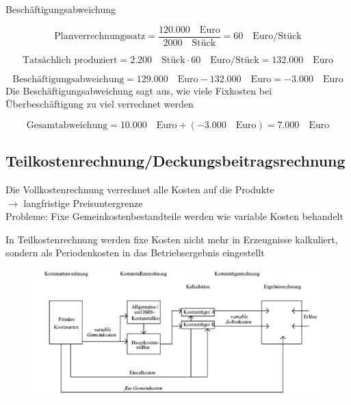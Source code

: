 \documentclass[a4paper,11pt, twoside]{article}
\begin{document}
Beschäftigungsabweichung

\[
\text{Planverrechnungssatz} = \frac{120.000\quad \text{Euro}}{2000\quad \text{Stück}} = 60\quad \text{Euro/Stück}
\]

\[
\text{Tatsächlich produziert} = 2.200\quad \text{Stück} \cdot 60\quad \text{Euro/Stück} = 132.000\quad \text{Euro}
\]

\[
\text{Beschäftigungsabweichung} = 129.000\quad \text{Euro} - 132.000\quad \text{Euro} = -3.000\quad \text{Euro}
\]
Die Beschäftigungsabweichung sagt aus, wie viele Fixkosten bei Überbeschäftigung zu viel verrechnet werden

\[
\text{Gesamtabweichung} = 10.000\quad \text{Euro} + (-3.000\quad \text{Euro}) = 7.000\quad \text{Euro}
\]

\subsection{Teilkostenrechnung/Deckungsbeitragsrechnung}

Die Vollkostenrechnung verrechnet alle Kosten auf die Produkte\\
$\rightarrow$ langfristige Preisuntergrenze\\
Probleme: Fixe Gemeinkostenbestandteile werden wie variable Kosten behandelt

In Teilkostenrechnung werden fixe Kosten nicht mehr in Erzeugnisse kalkuliert, sondern als Periodenkosten in das Betriebsergebnis eingestellt

\begin{figure}[h]
 \begin{center}
   \includegraphics[scale=0.5]{bilder/teilkostenrechnung.png}
 \end{center}
\end{figure}
\end{document}
